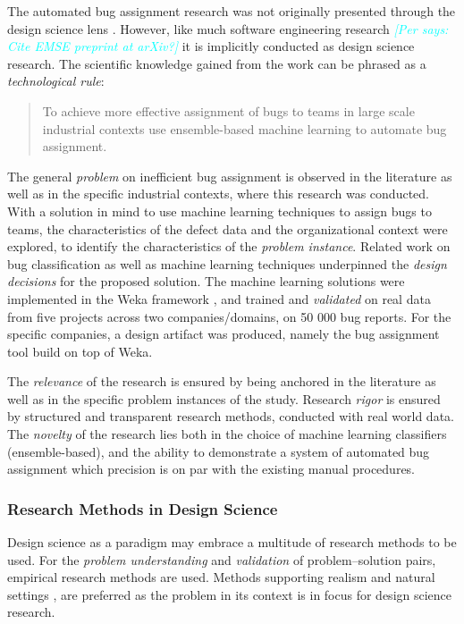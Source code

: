 \documentclass[graybox]{svmult}
\newcommand{\per}[1]{\textcolor{cyan}{{\it [Per says: #1]}}}
\newcommand{\per}[1]{}
\begin{document}
The automated bug assignment research was not originally presented through the design science lens \cite{JonssonBug15}. However, like much software engineering research \per{Cite EMSE preprint at arXiv?} it is implicitly conducted as design science research. 
The scientific knowledge gained from the work can be phrased as a \emph{technological rule}:
\begin{quote}{To achieve more effective assignment of bugs to teams in large scale industrial contexts use ensemble-based machine learning to automate bug assignment. \cite{StoreyESEM17}}\end{quote}

The general \emph{problem} on inefficient bug assignment is observed in the literature as well as in the specific industrial contexts, where this research was conducted. With a solution in mind to use machine learning techniques to assign bugs to teams, the characteristics of the defect data and the organizational context were explored, to identify the characteristics of the \emph{problem instance}. Related work on bug classification as well as machine learning techniques underpinned the \emph{design decisions} for the proposed solution. The machine learning solutions were implemented in the Weka framework \cite{hall_weka_2009}, and trained and \emph{validated} on real data from five projects across two companies/domains, on 50 000 bug reports. For the specific companies, a design artifact was produced, namely the bug assignment tool build on top of Weka.

The \emph{relevance} of the research is ensured by being anchored in the literature as well as in the specific problem instances of the study. Research \emph{rigor} is ensured by structured and transparent research methods, conducted with real world data. The \emph{novelty} of the research lies both in the choice of machine learning classifiers (ensemble-based), and the ability to demonstrate a system of automated bug assignment which precision is on par with the existing manual procedures.

\subsubsection{Research Methods in Design Science}

Design science as a paradigm may embrace a multitude of research methods to be used. For the \emph{problem understanding} and \emph{validation} of problem--solution pairs, empirical research methods are used. Methods supporting realism and natural settings \cite{StolABC18}, are preferred as the problem in its context is in focus for design science research. 
\end{document}

